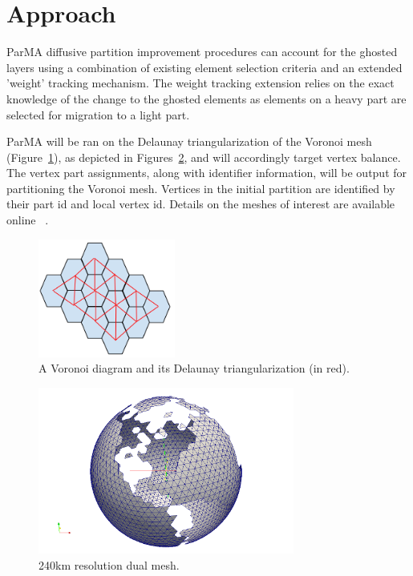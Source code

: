 \documentclass[a4paper]{article}
\begin{document}
\section{Approach}

ParMA diffusive partition improvement procedures can account for the ghosted layers using a combination of existing element selection criteria and an extended 'weight' tracking mechanism.  The weight tracking extension relies on the exact knowledge of the change to the ghosted elements as elements on a heavy part are selected for migration to a light part.

ParMA will be ran on the Delaunay triangularization of the Voronoi mesh (Figure~\ref{fig:delaunay}), as depicted in Figures~\ref{fig:NA240}, and will accordingly target vertex balance.  The vertex part assignments, along with identifier information, will be output for partitioning the Voronoi mesh. Vertices in the initial partition are identified by their part id and local vertex id.  Details on the meshes of interest are available online ~\cite{climateMesh}. 

\begin{figure} 
\centering
\includegraphics[width=0.4\textwidth]{ghostingOwnershipFig1.png}
\caption{\label{fig:delaunay} A Voronoi diagram and its Delaunay triangularization (in red).}
\end{figure}

\begin{figure}
\centering
\includegraphics[width=0.75\textwidth]{ocean_QU_240kmNA.png}
\caption{\label{fig:NA240} 240km resolution dual mesh.}
\end{figure}
\end{document}
